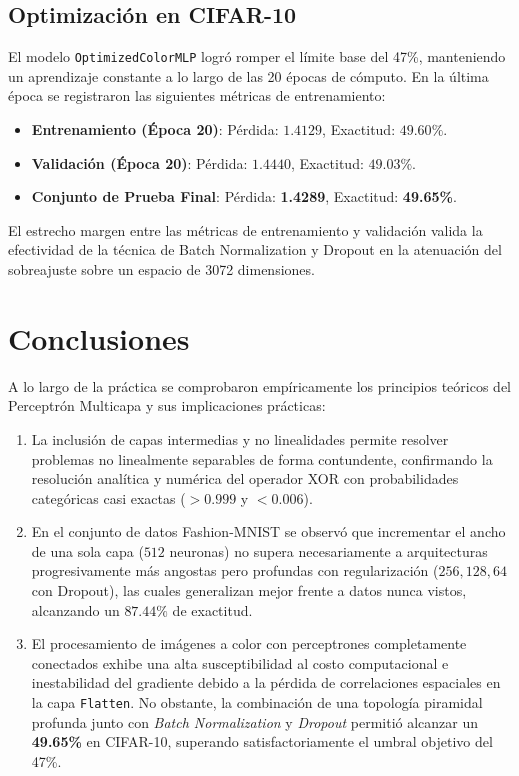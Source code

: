 \documentclass[12pt]{article}
\begin{document}
	\subsection{Optimización en CIFAR-10}
	El modelo \texttt{OptimizedColorMLP} logró romper el límite base del 47\%, manteniendo un aprendizaje constante a lo largo de las 20 épocas de cómputo. En la última época se registraron las siguientes métricas de entrenamiento:
	\begin{itemize}
		\item \textbf{Entrenamiento (Época 20)}: Pérdida: $1.4129$, Exactitud: $49.60\%$.
		\item \textbf{Validación (Época 20)}: Pérdida: $1.4440$, Exactitud: $49.03\%$.
		\item \textbf{Conjunto de Prueba Final}: Pérdida: \textbf{1.4289}, Exactitud: \textbf{49.65\%}.
	\end{itemize}
	
	El estrecho margen entre las métricas de entrenamiento y validación valida la efectividad de la técnica de Batch Normalization y Dropout en la atenuación del sobreajuste sobre un espacio de 3072 dimensiones.
	\newpage
	\section{Conclusiones}
	A lo largo de la práctica se comprobaron empíricamente los principios teóricos del Perceptrón Multicapa y sus implicaciones prácticas:
	\begin{enumerate}
		\item La inclusión de capas intermedias y no linealidades permite resolver problemas no linealmente separables de forma contundente, confirmando la resolución analítica y numérica del operador XOR con probabilidades categóricas casi exactas ($>0.999$ y $<0.006$).
		\item En el conjunto de datos Fashion-MNIST se observó que incrementar el ancho de una sola capa ($512$ neuronas) no supera necesariamente a arquitecturas progresivamente más angostas pero profundas con regularización ($256, 128, 64$ con Dropout), las cuales generalizan mejor frente a datos nunca vistos, alcanzando un $87.44\%$ de exactitud.
		\item El procesamiento de imágenes a color con perceptrones completamente conectados exhibe una alta susceptibilidad al costo computacional e inestabilidad del gradiente debido a la pérdida de correlaciones espaciales en la capa \texttt{Flatten}. No obstante, la combinación de una topología piramidal profunda junto con \textit{Batch Normalization} y \textit{Dropout} permitió alcanzar un \textbf{49.65\%} en CIFAR-10, superando satisfactoriamente el umbral objetivo del 47\%.
	\end{enumerate}
	
\end{document}
